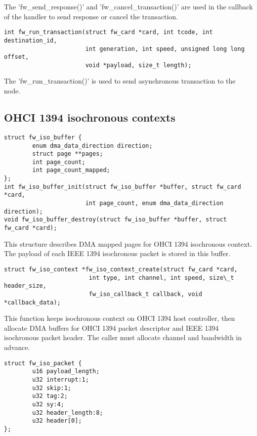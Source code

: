 \documentclass[onecolumn]{article}
\begin{document}
The 'fw\_send\_response()' and 'fw\_cancel\_transaction()' are used in the callback of the handler to send response or cancel the transaction.

\begin{verbatim}
int fw_run_transaction(struct fw_card *card, int tcode, int destination_id,
                       int generation, int speed, unsigned long long offset,
                       void *payload, size_t length);
\end{verbatim}

The 'fw\_run\_transaction()' is used to send asynchronous transaction to the node.

\subsection{OHCI 1394 isochronous contexts}

\begin{verbatim}
struct fw_iso_buffer {
        enum dma_data_direction direction;
        struct page **pages;
        int page_count;
        int page_count_mapped;
};
int fw_iso_buffer_init(struct fw_iso_buffer *buffer, struct fw_card *card,
                       int page_count, enum dma_data_direction direction);
void fw_iso_buffer_destroy(struct fw_iso_buffer *buffer, struct fw_card *card);
\end{verbatim}

This structure describes DMA mapped pages for OHCI 1394 isochronous context. The payload of each IEEE 1394 isochronous packet is stored in this buffer. 

\begin{verbatim}
struct fw_iso_context *fw_iso_context_create(struct fw_card *card,
                        int type, int channel, int speed, size\_t header_size,
                        fw_iso_callback_t callback, void *callback_data);
\end{verbatim}

This function keeps isochronous context on OHCI 1394 host controller, then allocate DMA buffers for OHCI 1394 packet descriptor and IEEE 1394 isochronous packet header. The caller must allocate channel and bandwidth in advance.

\begin{verbatim}
struct fw_iso_packet {
        u16 payload_length;
        u32 interrupt:1;
        u32 skip:1;
        u32 tag:2;
        u32 sy:4;
        u32 header_length:8;
        u32 header[0];
};
\end{verbatim}
\end{document}
